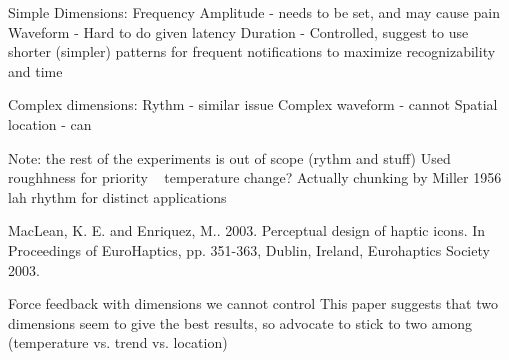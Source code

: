 Simple Dimensions:
Frequency
Amplitude - needs to be set, and may cause pain
Waveform - Hard to do given latency
Duration - Controlled, suggest to use shorter (simpler) patterns for frequent notifications to maximize recognizability and time

Complex dimensions:
Rythm - similar issue
Complex waveform - cannot
Spatial location - can

Note: the rest of the experiments is out of scope (rythm and stuff)
Used roughhness for priority ~ temperature change?
Actually chunking by Miller 1956 lah
rhythm for distinct applications


MacLean, K. E. and Enriquez, M.. 2003. Perceptual design of haptic icons. In Proceedings of EuroHaptics, pp. 351-363, Dublin, Ireland, Eurohaptics Society 2003.

Force feedback with dimensions we cannot control
This paper suggests that two dimensions seem to give the best results, so advocate to stick to two among (temperature vs. trend vs. location)

